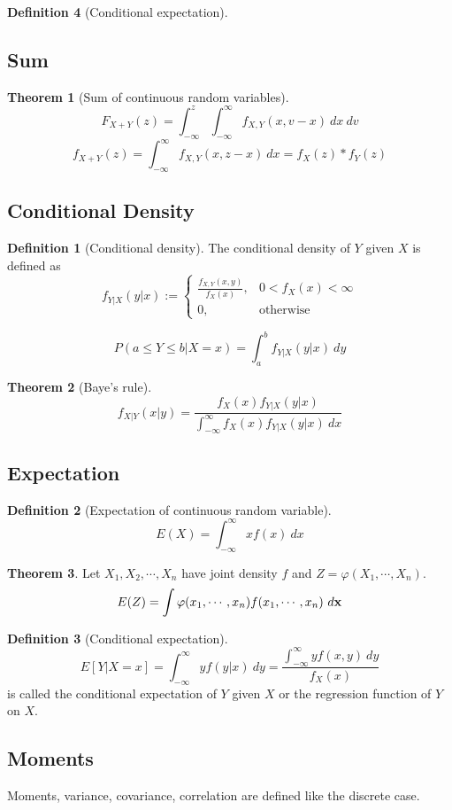 \documentclass[10pt, a4paper]{extarticle}
\theoremstyle{definition}
\newtheorem{thm}{Theorem}
\newtheorem{defn}{Definition}
\begin{document}
\begin{defn}[Conditional expectation]
	\subsection{Sum}
	\begin{thm}[Sum of continuous random variables]
	\[F_{X+Y}(z)=\int_{-\infty}^z\int_{-\infty}^\infty f_{X,Y}(x,v-x)\ dx\ dv\]
	\[f_{X+Y}(z)=\int_{-\infty}^\infty f_{X,Y}(x,z-x)\ dx=f_X(z)*f_Y(z)\]
	\end{thm}

	\subsection{Conditional Density}
	\begin{defn}[Conditional density]
		The conditional density of $Y$ given $X$ is defined as
		\[f_{Y|X}(y|x):=
			\begin{cases}
				\frac{f_{X,Y}(x,y)}{f_X(x)},&0<f_X(x)<\infty\\
				0,&\text{otherwise}
			\end{cases}
		\]

		\[P(a\leq Y\leq b|X=x)=\int_a^b f_{Y|X}(y|x)\ dy\]
		
	\end{defn}
	\begin{thm}[Baye's rule]
		\[f_{X|Y}(x|y)=\frac{f_X(x)f_{Y|X}(y|x)}{\int_{-\infty}^{\infty}f_X(x)f_{Y|X}(y|x)\ dx}\]
	\end{thm}

	\subsection{Expectation}
	\begin{defn}[Expectation of continuous random variable]
		\[E(X)=\int_{-\infty}^\infty xf(x)\ dx\]
	\end{defn}
	\begin{thm}
		Let $X_1,X_2,\cdots,X_n$ have joint density $f$ and $Z=\varphi(X_1,\cdots,X_n)$.
		\[E(Z)=\int \varphi(x_1,\cdots,x_n)f(x_1,\cdots,x_n)\ d\vb{x}\]
	\end{thm}
	\begin{defn}[Conditional expectation]
		\[E[Y|X=x]=\int_{-\infty}^\infty yf(y|x)\ dy=\frac{\int_{-\infty}^\infty yf(x,y)\ dy}{f_X(x)}\]
		is called the conditional expectation of $Y$ given $X$ or the regression function of $Y$ on $X$.
	\end{defn}

	\subsection{Moments}
	Moments, variance, covariance, correlation are defined like the discrete case.


\end{defn}
\end{document}

